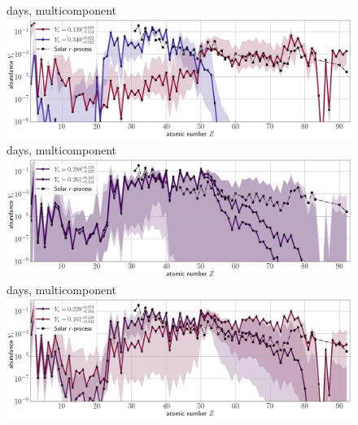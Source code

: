 \documentclass[twocolumn,twocolappendix]{aastex63}
\begin{document}
{{{{{{%
\begin{figure}[!ht]
    \centering {\ } \\ %
    \centering {\ } \\ %
     days, multicomponent \\
    \includegraphics[width=\textwidth]{figs/compare-components//compare_abunds_230103_064024_components_dynesty_100samples.png} \\
     days, multicomponent \\
    \includegraphics[width=\textwidth]{figs/compare-components//compare_abunds_230103_060017_components_dynesty_100samples.png} \\
     days, multicomponent \\
    \includegraphics[width=\textwidth]{figs/compare-components//compare_abunds_230622_230103_components_dynesty_100samples.png}\\

\end{figure}}}}}}}
\end{document}
